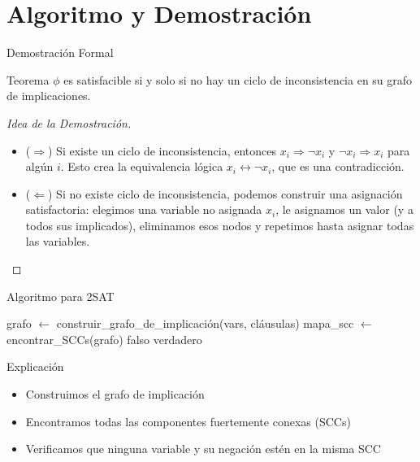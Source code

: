 \documentclass{beamer}
\begin{document}
\section{Algoritmo y Demostración}
\begin{frame}{Demostración Formal}
\begin{block}{Teorema}
$\phi$ es satisfacible si y solo si no hay un ciclo de inconsistencia en su grafo de implicaciones.
\end{block}

\begin{proof}[Idea de la Demostración]
\begin{itemize}
\item \alert{($\Rightarrow$)} Si existe un ciclo de inconsistencia, entonces $x_i \Rightarrow \neg x_i$ y $\neg x_i \Rightarrow x_i$ para algún $i$. Esto crea la equivalencia lógica $x_i \leftrightarrow \neg x_i$, que es una contradicción.

\item \alert{($\Leftarrow$)} Si no existe ciclo de inconsistencia, podemos construir una asignación satisfactoria: elegimos una variable no asignada $x_i$, le asignamos un valor (y a todos sus implicados), eliminamos esos nodos y repetimos hasta asignar todas las variables.
\end{itemize}
\end{proof}
\end{frame}

\begin{frame}{Algoritmo para 2SAT}
\begin{algorithm}[H]
\caption{2SAT (vars, cláusulas)}
\begin{algorithmic}[1]
\State grafo $\gets$ construir\_grafo\_de\_implicación(vars, cláusulas)
\State mapa\_scc $\gets$ encontrar\_SCCs(grafo)
        \State \Return falso
    \EndIf
\EndFor
\State \Return verdadero
\end{algorithmic}
\end{algorithm}

\begin{block}{Explicación}
\begin{itemize}
\item Construimos el grafo de implicación
\item Encontramos todas las componentes fuertemente conexas (SCCs)
\item Verificamos que ninguna variable y su negación estén en la misma SCC
\end{itemize}
\end{block}
\end{frame}
\end{document}

